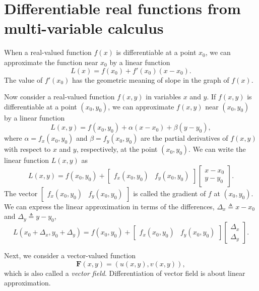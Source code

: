 \section{Differentiable real functions from multi-variable calculus}

When a real-valued function $f(x)$ is differentiable at a point $x_0$, we can approximate the function near $x_0$ by a linear function 
$$L(x) = f(x_0)+ f'(x_0)(x-x_0).
$$ The value of $f'(x_0)$ has the geometric meaning of slope in the graph of $f(x)$. 

Now consider a real-valued function $f(x,y)$ in variables $x$ and $y$. If $f(x,y)$ is differentiable at a point $(x_0,y_0)$, we can approximate $f(x,y)$ near $(x_0,y_0)$ by a linear function 
$$ L(x,y) = f(x_0,y_0) + \alpha (x-x_0)+ \beta(y-y_0),
$$
where $\alpha = f_x(x_0,y_0)$ and $\beta = f_y(x_0,y_0)$ are the partial derivatives of $f(x,y)$ with respect to $x$ and $y$, respectively, at the point $(x_0,y_0)$.
We can write the linear function $L(x,y)$ as
$$
L(x,y) = f(x_0,y_0) + 
\begin{bmatrix}
	f_x(x_0,y_0) & f_y(x_0,y_0)
\end{bmatrix}
\begin{bmatrix}
	x-x_0 \\ y-y_0
\end{bmatrix}.
$$
The vector 
$\begin{bmatrix}
	f_x(x_0,y_0) & f_y(x_0,y_0)
\end{bmatrix}$
is called the gradient of $f$ at $(x_0,y_0)$. We can express the linear approximation in terms of the differences,
$\Delta_x \triangleq x-x_0$ and $\Delta_y \triangleq y-y_0$,
$$
L(x_0+\Delta_x,y_0+\Delta_y) = f(x_0,y_0) + 
\begin{bmatrix}
	f_x(x_0,y_0) & f_y(x_0,y_0)
\end{bmatrix}
\begin{bmatrix}
	\Delta_x \\ \Delta_y
\end{bmatrix}.
$$

Next, we consider a vector-valued function 
$$\mathbf{F}(x,y) = (u(x,y), v(x,y)),
$$ 
which is also called a {\em vector field}. Differentiation of vector field is about linear approximation.

